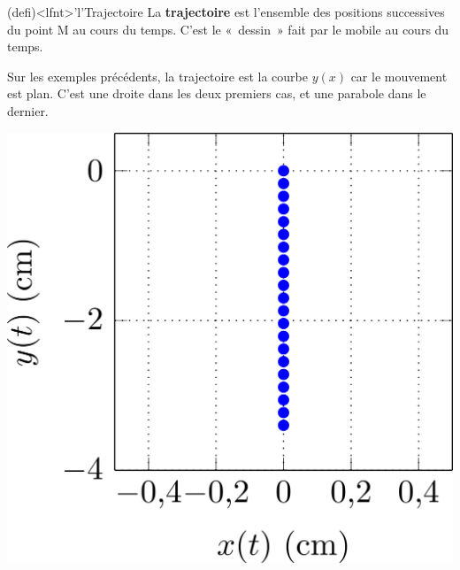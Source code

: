 \documentclass[../../main/main.tex]{subfiles}
\begin{document}

\begin{tcb*}(defi)<lfnt>'l'{Trajectoire}
	La \textbf{trajectoire} est l'ensemble des positions successives du point M
	au cours du temps. C'est le «~dessin~» fait par le mobile au cours du temps.
\end{tcb*}

Sur les exemples précédents, la trajectoire est la courbe $y(x)$ car le
mouvement est plan. C'est une droite dans les deux premiers cas, et une parabole
dans le dernier. \bigbreak

\begin{minipage}{0.31\linewidth}
	\begin{center}
		\includegraphics[width=\linewidth]{traj_glyc}
	\end{center}
\end{minipage}
\hfill
\end{document}
